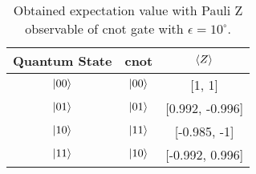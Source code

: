 \begin{table}[h]
  \centering
  \begin{tabular}{|c|c|c|}
    \hline
    Quantum State & \ac{cnot} & \(\expval{Z}\) \\
    \hline
    \(\ket{00}\) & \(\ket{00}\) & [1, 1] \\
    \hline
    \(\ket{01}\) & \(\ket{01}\) & [0.992, -0.996] \\
    \hline
    \(\ket{10}\) & \(\ket{11}\) & [-0.985, -1] \\
    \hline
    \(\ket{11}\) & \(\ket{10}\) & [-0.992, 0.996] \\
    \hline
  \end{tabular}
  \caption{Obtained expectation value with Pauli Z observable of \ac{cnot} gate with \(\epsilon = 10^{\circ}\).}\label{tab:cnot_real_noise}
\end{table} \



